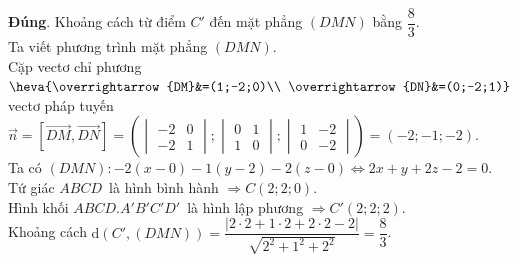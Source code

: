 \begin{ex}
{\begin{itemchoice}
			 \itemch \textbf{Đúng}. Khoảng cách từ điểm $C'$ đến mặt phẳng $(DMN)$ bằng $\dfrac{8}{3}$.\\
			Ta viết phương  trình mặt phẳng $(DMN)$.\\
			Cặp vectơ chỉ phương $\heva{\overrightarrow{DM}&=(1;-2;0)\\ \overrightarrow{DN}&=(0;-2;1)}$\\ 
			vectơ pháp tuyến  $\overrightarrow{n}=\left[\overrightarrow{DM},\overrightarrow{DN}\right]
			 =\left(
			\begin{vmatrix}
				-2 & 0 \\ -2 &  1
			\end{vmatrix};
			\begin{vmatrix}
				0 & 1  \\ 1 & 0
			\end{vmatrix};
			\begin{vmatrix}
				1 & -2 \\ 0 & -2 
			\end{vmatrix}
			\right)  =(-2;-1;-2)$.\\
			Ta có $(DMN)\colon -2(x-0)-1(y-2)-2(z-0) \Leftrightarrow 2x+y+2z-2=0$.\\ 
			Tứ giác $ABCD$~là  hình bình hành $ \Rightarrow C(2;2;0)$.\\
			Hình khối $ABCD.A'B'C'D'$~là hình lập phương $  \Rightarrow C'(2;2;2)$.\\
			Khoảng cách  $\mathrm{d}(C',(DMN))=\dfrac{\left|2\cdot2+1\cdot2+2\cdot2-2\right|}{\sqrt{2^2+1^2+2^2}}=\dfrac{8}{3}$.
		\end{itemchoice}
	 }
\end{ex}

